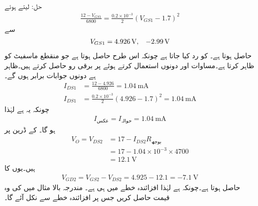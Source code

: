 حل: لیتے ہوئے
\begin{align*}
\frac{12-V_{GS1}}{6800}=\frac{0.2 \times 10^{-3}}{2} \left(V_{GS1}-1.7 \right)^2
\end{align*}
سے
\begin{align*}
V_{GS1}=\SI{4.926}{\volt}, \hspace{3mm} \SI{-2.99}{\volt}
\end{align*}
 حاصل ہوتا ہے۔ کو رد کیا جاتا ہے چونکہ اس طرح  حاصل ہوتا ہے جو منقطع ماسفیٹ کو ظاہر کرتا ہے۔مساوات  اور  دونوں استعمال کرتے ہوئے  پر برقی رو حاصل کرتے ہیں۔ظاہر ہے دونوں جوابات برابر ہوں گے۔
\begin{align*}
I_{DS1}&=\frac{12-4.926}{6800}=\SI{1.04}{\milli \ampere}\\
I_{DS1}&=\frac{0.2 \times 10^{-3}}{2} \left(4.926-1.7 \right)^2=\SI{1.04}{\milli \ampere}
\end{align*}
چونکہ یہ  ہے لہٰذا
\begin{align*}
I_{\text{عکس}}=I_{\text{حوالہ}}=\SI{1.04}{\milli \ampere}
\end{align*}
ہو گا۔ کے ڈرین پر
\begin{align*}
V_O=V_{DS2}&=17-I_{DS2} R_{\text{بوجھ} }\\
&=17- 1.04 \times 10^{-3} \times 4700\\
&=\SI{12.1}{\volt}
\end{align*}
ہیں۔یوں  کا 
\begin{align*}
V_{GD2}=V_{GS2}-V_{DS2}=4.925-12.1=\SI{-7.1}{\volt}
\end{align*}
حاصل ہوتا ہے۔چونکہ  ہے لہٰذا  افزائندہ خطے میں ہی ہے۔
مندرجہ بالا مثال میں  کی وہ قیمت حاصل کریں جس پر  افزائندہ خطے سے نکل آئے گا۔

